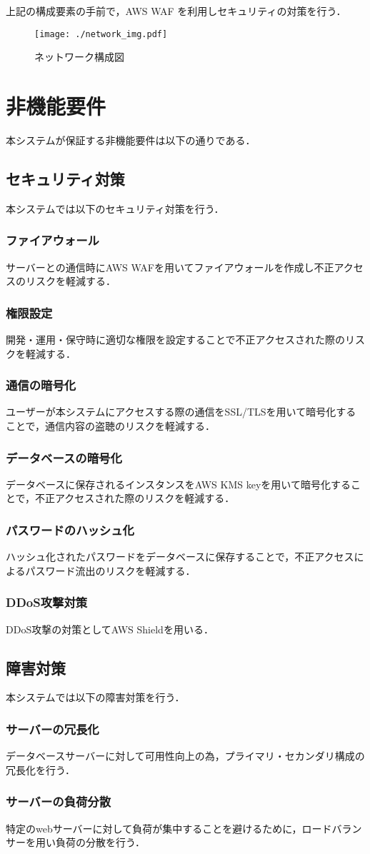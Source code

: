 \documentclass[a4paper, titlepage]{jsarticle}
\begin{document}
上記の構成要素の手前で，AWS WAF を利用しセキュリティの対策を行う．

\begin{figure}[H]
  \texttt{[image: ./network\_img.pdf]}
  \caption{ネットワーク構成図}
  \label{fig:network}
\end{figure}

\section{非機能要件}
本システムが保証する非機能要件は以下の通りである．
\subsection{セキュリティ対策}
本システムでは以下のセキュリティ対策を行う．
\subsubsection{ファイアウォール}
サーバーとの通信時にAWS WAFを用いてファイアウォールを作成し不正アクセスのリスクを軽減する．
\subsubsection{権限設定}
開発・運用・保守時に適切な権限を設定することで不正アクセスされた際のリスクを軽減する．
\subsubsection{通信の暗号化}
ユーザーが本システムにアクセスする際の通信をSSL/TLSを用いて暗号化することで，通信内容の盗聴のリスクを軽減する．
\subsubsection{データベースの暗号化}
データベースに保存されるインスタンスをAWS KMS keyを用いて暗号化することで，不正アクセスされた際のリスクを軽減する．
\subsubsection{パスワードのハッシュ化}
ハッシュ化されたパスワードをデータベースに保存することで，不正アクセスによるパスワード流出のリスクを軽減する．
\subsubsection{DDoS攻撃対策}
DDoS攻撃の対策としてAWS Shieldを用いる．
\subsection{障害対策}
本システムでは以下の障害対策を行う．
\subsubsection{サーバーの冗長化}
データベースサーバーに対して可用性向上の為，プライマリ・セカンダリ構成の冗長化を行う．
\subsubsection{サーバーの負荷分散}
特定のwebサーバーに対して負荷が集中することを避けるために，ロードバランサーを用い負荷の分散を行う．


\end{document}
